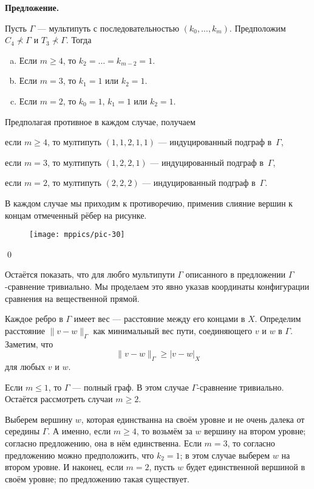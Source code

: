 \documentclass{article}
\def\parit#1{\medskip\noindent{\it #1}}
\def\qeds{\qed\par\medskip}
\def\qedsf{\vskip-6mm\qeds}
\newcounter{thm}[section]
\def\claim#1{\par\medskip\noindent\refstepcounter{thm}\hbox{\bf\boldmath #1.}
\it\ %
}
\def\endclaim{
\par\medskip}
\newenvironment{thm}{\claim}{\endclaim}
\begin{document}
\begin{thm}{Предложение}
Пусть $\Gamma$ --- мультипуть с последовательностью $(k_0,\dots, k_m)$.
Предположим $C_4\nprec\Gamma$ и $T_3\nprec\Gamma$.
Тогда
\begin{enumerate}[(a)]
 \item\label{lem:multipath:5} Если $m\geqslant 4$, то $k_2=\dots=k_{m-2}=1$.
 \item\label{lem:multipath:4} Если $m= 3$, то $k_1=1$ или $k_2=1$.
 \item\label{lem:multipath:3} Если $m= 2$, то $k_0=1$, $k_1=1$ или $k_2=1$.
\end{enumerate}

\end{thm}

\parit{Доказательство.} Предполагая противное в каждом случае, получаем

\parit{(\ref{lem:multipath:5})}
если $m\geqslant 4$, то мултипуть $(1,1,2,1,1)$ --- индуцированный подграф в~$\Gamma$,

\parit{(\ref{lem:multipath:4})}
если $m=3$, то мултипуть $(1,2,2,1)$ --- индуцированный подграф в~$\Gamma$,

\parit{(\ref{lem:multipath:3})}
если $m=2$, то мултипуть $(2,2,2)$ --- индуцированный подграф в~$\Gamma$.

В каждом случае мы приходим к противоречию, применив слияние вершин к концам отмеченный рёбер на рисунке.

\begin{figure}[h!]
\centering
\texttt{[image: mppics/pic-30]}
\end{figure}
\qedsf

Остаётся показать, что для любго мультипути $\Gamma$ описанного в предложении
$\Gamma$-сравнение тривиально.
Мы проделаем это явно указав координаты конфигурации сравнения на вещественной прямой.

Каждое ребро в $\Gamma$ имеет вес --- расстояние между его концами в $X$.
Определим расстояние $\|v-w\|_\Gamma$ как минимальный вес пути, соединяющего $v$ и $w$ в $\Gamma$.
Заметим, что 
\[\|v-w\|_\Gamma\geqslant |v-w|_X\]
для любых $v$ и $w$.

Если $m\leqslant 1$, то $\Gamma$ --- полный граф.
В этом случае $\Gamma$-сравнение тривиально.
Остаётся рассмотреть случаи $m\geqslant2$.

Выберем вершину $w$, которая единстванна на своём уровне и не очень далека от середины $\Gamma$.
А именно, если $m\geqslant 4$, то возьмём за $w$ вершину на втором уровне; 
согласно предложению, она в нём единственна.
Если $m=3$, то согласно предложению можно предположить, что $k_2=1$;
в этом случае выберем $w$ на втором уровне.
И наконец, если $m=2$, пусть $w$ будет единственной вершиной в своём уровне;
по предложению такая существует.
\end{document}
